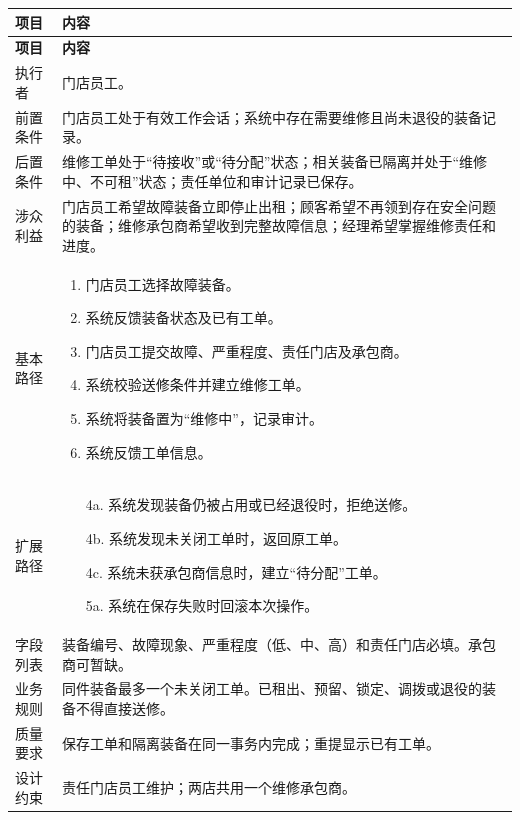 \documentclass[11pt,a4paper]{article}
\renewcommand{\arraystretch}{1.28}
\newcommand{\toprule}{\hline}
\newcommand{\midrule}{\hline}
\newcommand{\bottomrule}{\hline}
\begin{document}
{\small\renewcommand{\arraystretch}{1.13}\setlength{\parskip}{0pt}
\begin{longtable}{L{2.2cm}L{13.1cm}}
\toprule\bfseries 项目 & \bfseries 内容\\
\midrule\endfirsthead
\toprule\bfseries 项目 & \bfseries 内容\\
\midrule\endhead
执行者 & 门店员工。\\
前置条件 & 门店员工处于有效工作会话；系统中存在需要维修且尚未退役的装备记录。\\
后置条件 & 维修工单处于“待接收”或“待分配”状态；相关装备已隔离并处于“维修中、不可租”状态；责任单位和审计记录已保存。\\
涉众利益 & 门店员工希望故障装备立即停止出租；顾客希望不再领到存在安全问题的装备；维修承包商希望收到完整故障信息；经理希望掌握维修责任和进度。\\
基本路径 & \begin{enumerate}
\item 门店员工选择故障装备。
\item 系统反馈装备状态及已有工单。
\item 门店员工提交故障、严重程度、责任门店及承包商。
\item 系统校验送修条件并建立维修工单。
\item 系统将装备置为“维修中”，记录审计。
\item 系统反馈工单信息。
\end{enumerate}\\
扩展路径 & \begin{itemize}
\item[4a.] 系统发现装备仍被占用或已经退役时，拒绝送修。
\item[4b.] 系统发现未关闭工单时，返回原工单。
\item[4c.] 系统未获承包商信息时，建立“待分配”工单。
\item[5a.] 系统在保存失败时回滚本次操作。
\end{itemize}\\
字段列表 & 装备编号、故障现象、严重程度（低、中、高）和责任门店必填。承包商可暂缺。\\
业务规则 & 同件装备最多一个未关闭工单。已租出、预留、锁定、调拨或退役的装备不得直接送修。\\
质量要求 & 保存工单和隔离装备在同一事务内完成；重提显示已有工单。\\
设计约束 & 责任门店员工维护；两店共用一个维修承包商。\\
\bottomrule
\end{longtable}}
\end{document}
